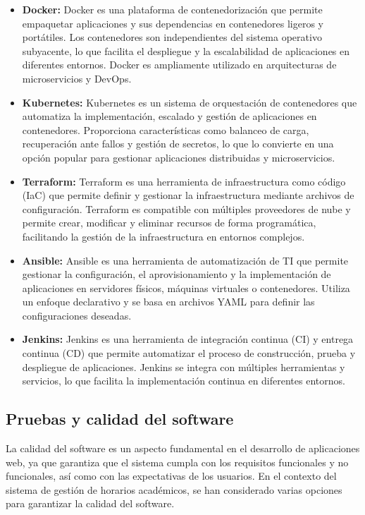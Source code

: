 \begin{itemize}
    \item \textbf{Docker\cite{docker}:} Docker es una plataforma de contenedorización que permite empaquetar aplicaciones y sus dependencias en contenedores ligeros y portátiles. Los contenedores son independientes del sistema operativo subyacente, lo que facilita el despliegue y la escalabilidad de aplicaciones en diferentes entornos. Docker es ampliamente utilizado en arquitecturas de microservicios y DevOps.
    \item \textbf{Kubernetes\cite{kubernetes}:} Kubernetes es un sistema de orquestación de contenedores que automatiza la implementación, escalado y gestión de aplicaciones en contenedores. Proporciona características como balanceo de carga, recuperación ante fallos y gestión de secretos, lo que lo convierte en una opción popular para gestionar aplicaciones distribuidas y microservicios.
    \item \textbf{Terraform\cite{terraform}:} Terraform es una herramienta de infraestructura como código (IaC) que permite definir y gestionar la infraestructura mediante archivos de configuración. Terraform es compatible con múltiples proveedores de nube y permite crear, modificar y eliminar recursos de forma programática, facilitando la gestión de la infraestructura en entornos complejos.
    \item \textbf{Ansible\cite{ansible}:} Ansible es una herramienta de automatización de TI que permite gestionar la configuración, el aprovisionamiento y la implementación de aplicaciones en servidores físicos, máquinas virtuales o contenedores. Utiliza un enfoque declarativo y se basa en archivos YAML para definir las configuraciones deseadas.
    \item \textbf{Jenkins\cite{jenkins}:} Jenkins es una herramienta de integración continua (CI) y entrega continua (CD) que permite automatizar el proceso de construcción, prueba y despliegue de aplicaciones. Jenkins se integra con múltiples herramientas y servicios, lo que facilita la implementación continua en diferentes entornos.
\end{itemize}

\subsection{Pruebas y calidad del software}

La calidad del software es un aspecto fundamental en el desarrollo de aplicaciones web, ya que garantiza que el sistema cumpla con los requisitos funcionales y no funcionales, así como con las expectativas de los usuarios. En el contexto del sistema de gestión de horarios académicos, se han considerado varias opciones para garantizar la calidad del software.

